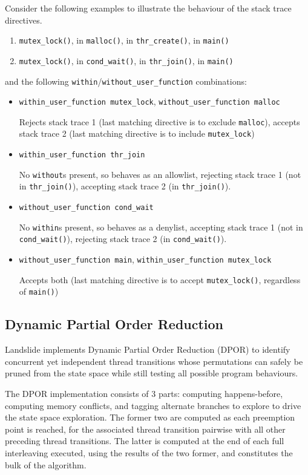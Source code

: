 Consider the following examples to illustrate the behaviour of the stack trace directives.
\begin{enumerate}
	\item
		{\tt mutex\_lock()}, in
		{\tt malloc()}, in
		{\tt thr\_create()}, in
		{\tt main()}
	\item
		{\tt mutex\_lock()}, in
		{\tt cond\_wait()}, in
		{\tt thr\_join()}, in
		{\tt main()}
\end{enumerate}
and the following {\tt within}/{\tt without\_user\_function} combinations:
\begin{itemize}
	\item
		{\tt within\_user\_function mutex\_lock},
		{\tt without\_user\_function malloc}

		Rejects stack trace 1 (last matching directive is to exclude {\tt malloc}),
		accepts stack trace 2 (last matching directive is to include {\tt mutex\_lock})
	\item
		{\tt within\_user\_function thr\_join}

		No {\tt without}s present, so behaves as an allowlist,
		rejecting stack trace 1 (not in {\tt thr\_join()}),
		accepting stack trace 2 (in {\tt thr\_join()}).
	\item
		{\tt without\_user\_function cond\_wait}

		No {\tt within}s present, so behaves as a denylist,
		accepting stack trace 1 (not in {\tt cond\_\allowbreak{}wait()}),
		rejecting stack trace 2 (in {\tt cond\_wait()}).
	\item
		{\tt without\_user\_function main},
		{\tt within\_user\_function mutex\_lock}

		Accepts both (last matching directive is to accept {\tt mutex\_lock()},
		regardless of {\tt main()})
\end{itemize}


\subsection{Dynamic Partial Order Reduction}
\label{sec:landslide-dpor}

Landslide implements Dynamic Partial Order Reduction (DPOR) \cite{dpor}
to identify concurrent yet independent thread transitions
whose permutations can safely be pruned from the state space
while still testing all possible program behaviours.

The DPOR implementation consists of 3 parts:
computing happens-before,
computing memory conflicts,
and tagging alternate branches to explore to drive the state space exploration.
The former two are computed as each preemption point is reached,
for the associated thread transition pairwise with all other preceding thread transitions.
The latter is computed at the end of each full interleaving executed, using the results of the two former,
and constitutes the bulk of the algorithm.

